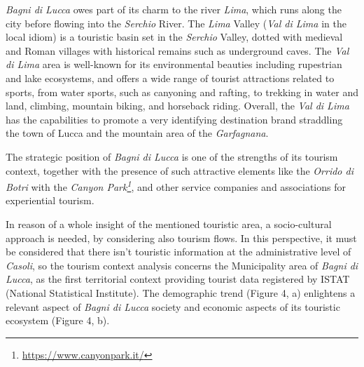 \documentclass[sustainability,article,submit,pdftex,moreauthors]{Definitions/mdpi}
\begin{document}
\emph{Bagni di Lucca} owes part of its charm to the river \emph{Lima}, which runs along the city before flowing into the \textit{Serchio} River. The \emph{Lima} Valley (\emph {Val di Lima} in the local idiom) is a touristic basin set in the \textit{Serchio} Valley, dotted with medieval and Roman villages with historical remains such as underground caves. The \emph{Val di Lima} area is well-known for its environmental beauties including rupestrian and lake ecosystems, and offers a wide range of tourist attractions related to sports, from water sports, such as canyoning and rafting, to trekking in water and land, climbing, mountain biking, and horseback riding. Overall, the \emph{Val di Lima} has the capabilities to promote a very identifying destination brand straddling the town of Lucca and the mountain area of the \textit{Garfagnana}.

The strategic position of \emph{Bagni di Lucca} is one of the strengths of its tourism context, together with the presence of such attractive elements like the \emph{Orrido di Botri} with the \emph{Canyon Park\footnote{\url{ https://www.canyonpark.it/}}}, and other service companies and associations for experiential tourism.

In reason of a whole insight of the mentioned touristic area, a socio-cultural approach is needed, by considering also tourism flows. In this perspective, it must be considered that there isn’t touristic information at the administrative level of \emph{Casoli}, so the tourism context analysis concerns the Municipality area of \emph{Bagni di Lucca}, as the first territorial context providing tourist data registered by ISTAT (National Statistical Institute).
 The demographic trend (Figure 4, a) enlightens a relevant aspect of \emph{Bagni di Lucca} society and economic aspects of its touristic ecosystem (Figure 4, b).
\end{document}
